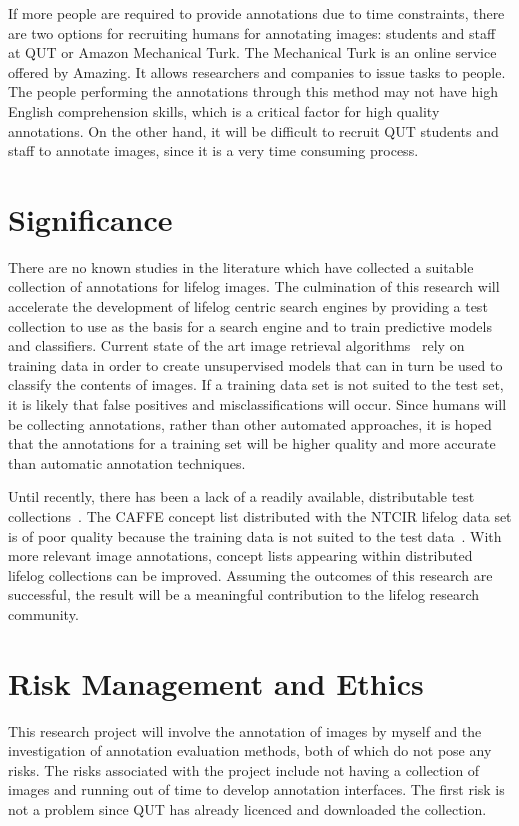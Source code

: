 \documentclass[12pt,a4paper]{article}
\begin{document}
If more people are required to provide annotations due to time constraints, there are two options for recruiting humans for annotating images: students and staff at QUT or Amazon Mechanical Turk. The Mechanical Turk is an online service offered by Amazing. It allows researchers and companies to issue tasks to people. The people performing the annotations through this method may not have high English comprehension skills, which is a critical factor for high quality annotations. On the other hand, it will be difficult to recruit QUT students and staff to annotate images, since it is a very time consuming process.

\section{Significance}
There are no known studies in the literature which have collected a suitable collection of annotations for lifelog images. The culmination of this research will accelerate the development of lifelog centric search engines by providing a test collection to use as the basis for a search engine and to train predictive models and classifiers. Current state of the art image retrieval algorithms~\cite{karpathy2015deep} rely on training data in order to create unsupervised models that can in turn be used to classify the contents of images. If a training data set is not suited to the test set, it is likely that false positives and misclassifications will occur. Since humans will be collecting annotations, rather than other automated approaches, it is hoped that the annotations for a training set will be higher quality and more accurate than automatic annotation techniques. 

Until recently, there has been a lack of a readily available, distributable test collections~\cite{gurrin2014lifelogging}. The CAFFE concept list distributed with the NTCIR lifelog data set is of poor quality because the training data is not suited to the test data~\cite{harry2016lifelog}. With more relevant image annotations, concept lists appearing within distributed lifelog collections can be improved. Assuming the outcomes of this research are successful, the result will be a meaningful contribution to the lifelog research community.

\section{Risk Management and Ethics}
This research project will involve the annotation of images by myself and the investigation of annotation evaluation methods, both of which do not pose any risks. The risks associated with the project include not having a collection of images and running out of time to develop annotation interfaces. The first risk is not a problem since QUT has already licenced and downloaded the collection.
\end{document}
